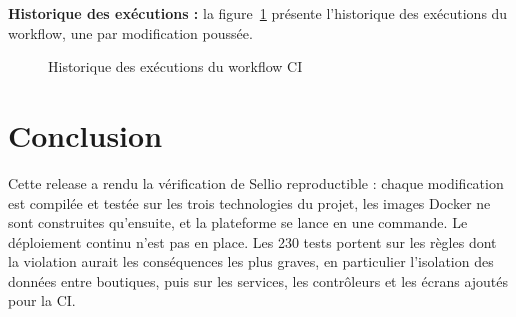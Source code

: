 \textbf{Historique des exécutions :} la figure~\ref{fig:ui-runs} présente l'historique des exécutions du workflow, une par modification poussée.
\begin{figure}[H]
    \centering
    \caption{Historique des exécutions du workflow CI}
    \label{fig:ui-runs}
\end{figure}

\section*{Conclusion}
Cette release a rendu la vérification de Sellio reproductible : chaque modification est compilée et testée sur les trois technologies du projet, les images Docker ne sont construites qu'ensuite, et la plateforme se lance en une commande. Le déploiement continu n'est pas en place. Les 230 tests portent sur les règles dont la violation aurait les conséquences les plus graves, en particulier l'isolation des données entre boutiques, puis sur les services, les contrôleurs et les écrans ajoutés pour la CI.
